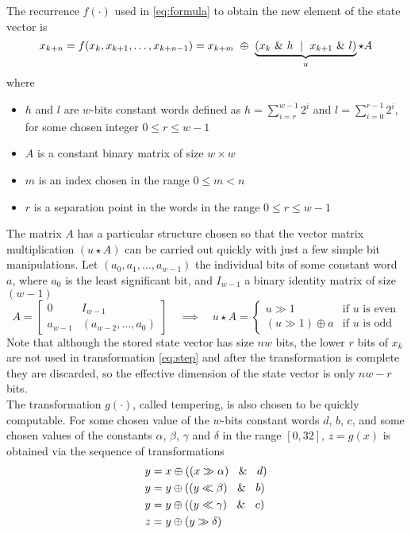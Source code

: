 \documentclass[preprint,1p,times]{elsarticle}
\begin{document}
\noindent The recurrence $f(\cdot)$ used in \eqref{eq:formula} to obtain the new element of the state vector is
\begin{equation}
\label{eq:step}
    x_{k+n} = f(x_{k},x_{k+1}, \dots, x_{k+n-1}) = x_{k+m} ~\mathbin{\oplus} ~\underbrace{\left({x_k}~\&~h ~\mid~ x_{k+1}~\&~l\right) }_u \star A 
\end{equation}
where
\begin{itemize}
    \item $h$ and $l$ are $w$-bits constant words defined as $h=\sum_{i=r}^{w-1}2^i$ and $l=\sum_{i=0}^{r-1}2^i$, for some chosen integer $0 \le r \le w-1$ 
    \item $A$ is a constant binary matrix of size $w \times w$
    \item $m$ is an index chosen in the range $0 \le m < n$
    \item $r$ is a separation point in the words in the range $0 \le r \le w-1$
\end{itemize}
The matrix $A$ has a particular structure chosen so that the vector matrix multiplication $(u\star A)$ can be carried out quickly with just a few simple bit manipulations. Let $(a_0, a_1, \dots, a_{w-1})$ the individual bits of some constant word $a$, where $a_0$ is the least significant bit, and $I_{w-1}$ a binary identity matrix of size $(w-1)$
\begin{equation}
\label{eq:matmult}
A = \left[ \begin{matrix} 0 & I_{w - 1} \\ a_{w-1} & (a_{w - 2}, \ldots , a_0) \end{matrix} \right] \quad \implies \quad u\star A = \begin{cases}u \gg 1 & \text{if $u$ is even}\\(u \gg 1) \oplus a & \text{if $u$ is odd}\end{cases}
\end{equation}
Note that although the stored state vector has size $nw$ bits, the lower $r$ bits of $x_k$ are not used in transformation \eqref{eq:step} and after the transformation is complete they are discarded, so the effective dimension of the state vector is only $nw-r$ bits. \\ %

\noindent The transformation $g(\cdot)$, called tempering, is also chosen to be quickly computable. For some chosen value of the $w$-bits constant words $d$, $b$, $c$, and some chosen values of the constants $\alpha$, $\beta$, $\gamma$ and $\delta$ in the range $[0,32]$, $z=g(x)$ is obtained via the sequence of transformations
\begin{equation}
\label{eq:tempering}
\begin{aligned}
y &= x \oplus ((x\gg \alpha)~\And~d)\\
y &= y \oplus ((y\ll \beta)~\And~b)\\
y &= y \oplus ((y\ll \gamma)~\And~c)\\
z &= y \oplus (y\gg \delta)
\end{aligned}
\end{equation}
\end{document}
